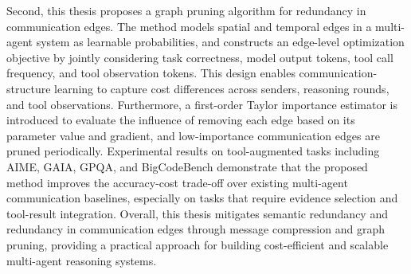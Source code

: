 \begin{abstractEn}
  Second, this thesis proposes a graph pruning algorithm for redundancy in communication edges. The method models spatial and temporal edges in a multi-agent system as learnable probabilities, and constructs an edge-level optimization objective by jointly considering task correctness, model output tokens, tool call frequency, and tool observation tokens. This design enables communication-structure learning to capture cost differences across senders, reasoning rounds, and tool observations. Furthermore, a first-order Taylor importance estimator is introduced to evaluate the influence of removing each edge based on its parameter value and gradient, and low-importance communication edges are pruned periodically. Experimental results on tool-augmented tasks including AIME, GAIA, GPQA, and BigCodeBench demonstrate that the proposed method improves the accuracy-cost trade-off over existing multi-agent communication baselines, especially on tasks that require evidence selection and tool-result integration. Overall, this thesis mitigates semantic redundancy and redundancy in communication edges through message compression and graph pruning, providing a practical approach for building cost-efficient and scalable multi-agent reasoning systems.
\end{abstractEn}
